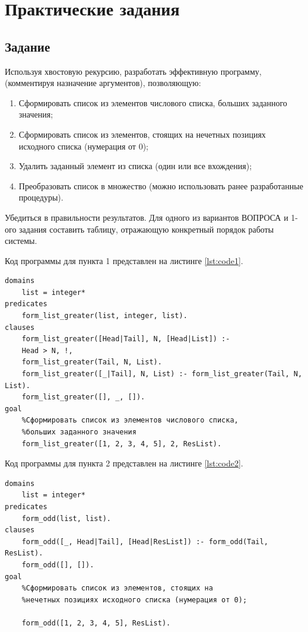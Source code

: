\chapter{Практические задания}
\section{Задание}
\vspace{-0.7cm}
Используя хвостовую рекурсию, разработать эффективную программу,
(комментируя назначение аргументов), позволяющую:
\begin{enumerate}
	\item Сформировать список из элементов числового списка, больших заданного
	значения;
	\item Сформировать список из элементов, стоящих на нечетных позициях исходного
	списка (нумерация от 0);
	\item Удалить заданный элемент из списка (один или все вхождения);
	\item Преобразовать список в множество (можно использовать ранее разработанные
	процедуры).
\end{enumerate}
Убедиться в правильности результатов. Для одного из вариантов ВОПРОСА и 1-ого задания составить таблицу,
отражающую конкретный порядок работы системы.

Код программы для пункта 1 представлен на листинге \ref{lst:code1}.
\begin{lstlisting}[label=lst:code1, basicstyle=\footnotesize, caption=Код программы (пункт 1)]
domains
	list = integer*
predicates
	form_list_greater(list, integer, list).
clauses
	form_list_greater([Head|Tail], N, [Head|List]) :- 
	Head > N, !,  
	form_list_greater(Tail, N, List).
	form_list_greater([_|Tail], N, List) :- form_list_greater(Tail, N, List).
	form_list_greater([], _, []).
goal
	%Сформировать список из элементов числового списка, 
	%больших заданного значения
	form_list_greater([1, 2, 3, 4, 5], 2, ResList).
\end{lstlisting}

Код программы для пункта 2 представлен на листинге \ref{lst:code2}.
\newpage
\begin{lstlisting}[label=lst:code2, basicstyle=\footnotesize, caption=Код программы (пункт 2)]
domains
	list = integer*
predicates
	form_odd(list, list).
clauses
	form_odd([_, Head|Tail], [Head|ResList]) :- form_odd(Tail, ResList).
	form_odd([], []).
goal
    %Сформировать список из элементов, стоящих на 
    %нечетных позициях исходного списка (нумерация от 0);

	form_odd([1, 2, 3, 4, 5], ResList).
\end{lstlisting}

